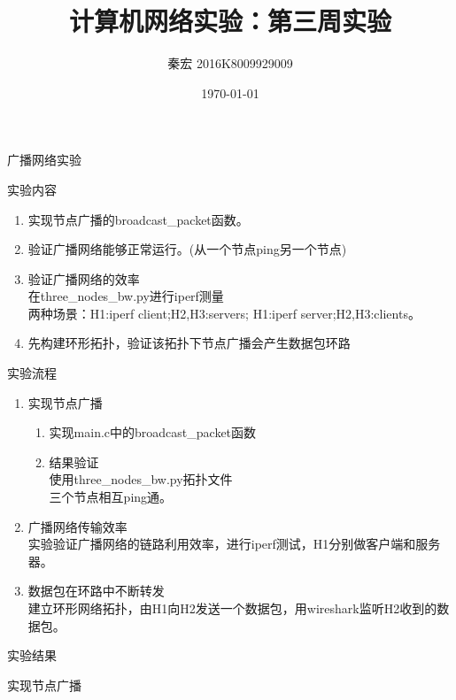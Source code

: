 \documentclass{article} %
\title{计算机网络实验：第三周实验}  %
\author{秦宏 2016K8009929009}   %
\date{\today}       %
\begin{document}
	\maketitle          %
	\begin{section}{广播网络实验}
		\begin{subsection}{实验内容}
			\begin{enumerate}[1)]
				\item 实现节点广播的broadcast\_packet函数。
				\item 验证广播网络能够正常运行。(从一个节点ping另一个节点)
				\item 验证广播网络的效率\\
				在three\_nodes\_bw.py进行iperf测量\\
				两种场景：H1:iperf client;H2,H3:servers; H1:iperf server;H2,H3:clients。
				\item 先构建环形拓扑，验证该拓扑下节点广播会产生数据包环路
			\end{enumerate}
			\end{subsection}
		\begin{subsection}{实验流程}
			\begin{enumerate}[1)]
				\item 实现节点广播
					\begin{enumerate}[(1)]
						\item 实现main.c中的broadcast\_packet函数
						\item 结果验证\\
						使用three\_nodes\_bw.py拓扑文件\\
						三个节点相互ping通。
					\end{enumerate}
				\item 广播网络传输效率\\
				实验验证广播网络的链路利用效率，进行iperf测试，H1分别做客户端和服务器。
				\item 数据包在环路中不断转发\\
				建立环形网络拓扑，由H1向H2发送一个数据包，用wireshark监听H2收到的数据包。
			\end{enumerate}
			\end{subsection}
		\begin{subsection}{实验结果}
			\begin{subsubsection}{实现节点广播}

\end{subsubsection}
\end{subsection}
\end{section}
\end{document}
